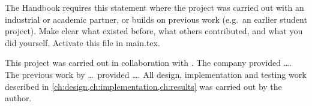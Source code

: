 
\begin{guidance}
The Handbook requires this statement where the project was carried out with
an industrial or academic partner, or builds on previous work (e.g.\ an
earlier student project). Make clear what existed before, what others
contributed, and what you did yourself. Activate this file in main.tex.
\end{guidance}

This project was carried out in collaboration with . The
company provided \ldots. The previous work by \ldots\ provided \ldots. All
design, implementation and testing work described in
\cref{ch:design,ch:implementation,ch:results} was carried out by the author.
